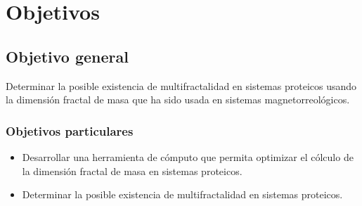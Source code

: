 \chapter{Objetivos}
\section{Objetivo general}

Determinar la posible existencia de multifractalidad en sistemas proteicos usando la dimensi\'{o}n fractal de masa que ha sido usada en sistemas magnetorreol\'{o}gicos. 

\subsection{Objetivos particulares}

\begin{itemize}

\item Desarrollar una herramienta de c\'{o}mputo que permita optimizar el c\'{o}lculo de la dimensi\'{o}n fractal de masa en sistemas proteicos.

\item Determinar la posible existencia de multifractalidad en sistemas proteicos.

\end{itemize}